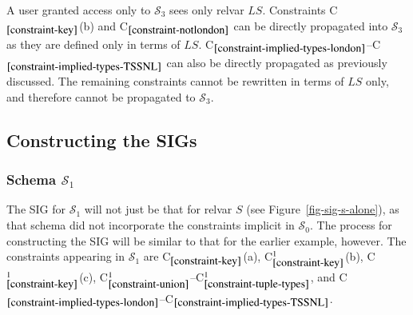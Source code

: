 \documentclass{sig-alternate-05-2015}
\newcounter{constraint}
\newcommand{\LS}{\ensuremath{\mathit{LS}}}
\newcommand{\SC}[1]{\ensuremath{\mathcal{S}_{#1}}}
\begin{document}
\noindent A user granted access only to \(\SC{3}\) sees only relvar \(\LS\). Constraints C\(_{\ref{constraint-key}}\)(b) and C\(_{\ref{constraint-notlondon}}\) can be directly propagated into \(\SC{3}\) as they are defined only  in terms of \(\LS\). C\(_{\ref{constraint-implied-types-london}}\)--C\(_{\ref{constraint-implied-types-TSSNL}}\) can also be directly propagated as previously discussed. The remaining constraints cannot be rewritten in terms of \(\LS\) only, and therefore cannot be propagated to \(\SC{3}\).



\newpage

\subsection{Constructing the SIGs}
\label{sec-date-sigs}




\subsubsection{Schema \(\SC{1}\)}
\label{sec-sigs-s-i}

\noindent The SIG for \(\SC{1}\) will not just be that for relvar \(S\!\) (see Figure~\ref{fig-sig-s-alone}), as that schema did not incorporate the constraints implicit in \(\SC{0}\). The process for constructing the SIG will be similar to that for the earlier example, however. The constraints appearing in \(\SC{1}\) are C\(_{\ref{constraint-key}}\)(a), C\(_{\ref{constraint-key}}^{1}\)(b), C\(_{\ref{constraint-key}}^{1}\)(c), C\(_{\ref{constraint-union}}^{1}\)--C\(_{\ref{constraint-tuple-types}}^{1}\), and C\(_{\ref{constraint-implied-types-london}}\)--C\(_{\ref{constraint-implied-types-TSSNL}}\).
\end{document}
